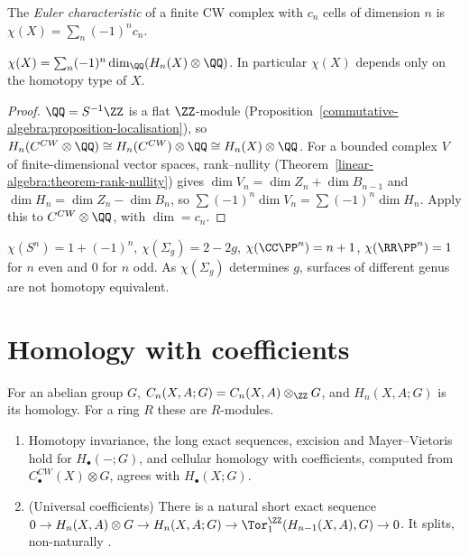 \begin{definition}\label{singular-homology:definition-euler-characteristic}
The \emph{Euler characteristic} of a finite CW complex with $c_n$ cells of dimension $n$ is $\chi(X) = \sum_n (-1)^nc_n$.
\end{definition}

\begin{proposition}\label{singular-homology:proposition-euler-characteristic}
$\chi(X) = \sum_n (-1)^n\dim_\QQ(H_n(X) \otimes \QQ)$. In particular $\chi(X)$ depends only on the homotopy type of $X$.
\end{proposition}

\begin{proof}
$\QQ = S^{-1}\ZZ$ is a flat $\ZZ$-module (Proposition~\ref{commutative-algebra:proposition-localisation}), so $H_n(C^{CW} \otimes \QQ) \cong H_n(C^{CW}) \otimes \QQ \cong H_n(X) \otimes \QQ$.
For a bounded complex $V$ of finite-dimensional vector spaces, rank--nullity (Theorem~\ref{linear-algebra:theorem-rank-nullity}) gives
$\dim V_n = \dim Z_n + \dim B_{n-1}$ and $\dim H_n = \dim Z_n - \dim B_n$, so $\sum(-1)^n\dim V_n = \sum(-1)^n\dim H_n$. Apply this to $C^{CW} \otimes \QQ$, with $\dim = c_n$.
\end{proof}

\begin{example}\label{singular-homology:example-euler}
$\chi(S^n) = 1 + (-1)^n$, $\chi(\Sigma_g) = 2 - 2g$, $\chi(\CC\PP^n) = n + 1$, $\chi(\RR\PP^n) = 1$ for $n$ even and $0$ for $n$ odd. As $\chi(\Sigma_g)$ determines $g$, surfaces of
different genus are not homotopy equivalent.
\end{example}

\section{Homology with coefficients}\label{singular-homology:section-coefficients}

\begin{definition}\label{singular-homology:definition-coefficients}
For an abelian group $G$, $C_n(X, A; G) = C_n(X, A) \otimes_\ZZ G$, and $H_n(X, A; G)$ is its homology. For a ring $R$ these are $R$-modules.
\end{definition}

\begin{theorem}\label{singular-homology:theorem-coefficients}
\begin{enumerate}
\item Homotopy invariance, the long exact sequences, excision and Mayer--Vietoris hold for $H_\bullet(-; G)$, and cellular homology with coefficients, computed from
$C^{CW}_\bullet(X) \otimes G$, agrees with $H_\bullet(X; G)$.
\item (Universal coefficients) There is a natural short exact sequence
$0 \to H_n(X, A) \otimes G \to H_n(X, A; G) \to \Tor_1^\ZZ(H_{n-1}(X, A), G) \to 0$. It splits, non-naturally \cite[Theorem 3A.3]{hatcher-at}.
\end{enumerate}
\end{theorem}

